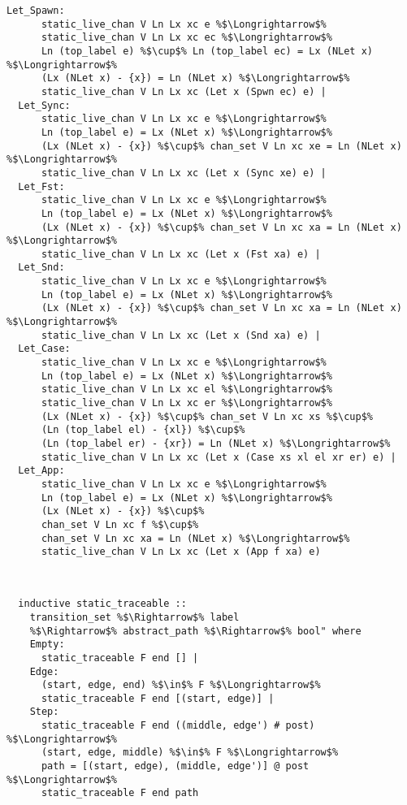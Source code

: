 \documentclass{article}
\begin{document}
\begin{lstlisting}[style=codestyle1, escapechar=\%]
  Let_Spawn:
      static_live_chan V Ln Lx xc e %$\Longrightarrow$%
      static_live_chan V Ln Lx xc ec %$\Longrightarrow$%
      Ln (top_label e) %$\cup$% Ln (top_label ec) = Lx (NLet x) %$\Longrightarrow$%
      (Lx (NLet x) - {x}) = Ln (NLet x) %$\Longrightarrow$%
      static_live_chan V Ln Lx xc (Let x (Spwn ec) e) |
  Let_Sync:
      static_live_chan V Ln Lx xc e %$\Longrightarrow$%
      Ln (top_label e) = Lx (NLet x) %$\Longrightarrow$%
      (Lx (NLet x) - {x}) %$\cup$% chan_set V Ln xc xe = Ln (NLet x) %$\Longrightarrow$%
      static_live_chan V Ln Lx xc (Let x (Sync xe) e) |
  Let_Fst:
      static_live_chan V Ln Lx xc e %$\Longrightarrow$%
      Ln (top_label e) = Lx (NLet x) %$\Longrightarrow$%
      (Lx (NLet x) - {x}) %$\cup$% chan_set V Ln xc xa = Ln (NLet x) %$\Longrightarrow$%
      static_live_chan V Ln Lx xc (Let x (Fst xa) e) |
  Let_Snd:
      static_live_chan V Ln Lx xc e %$\Longrightarrow$%
      Ln (top_label e) = Lx (NLet x) %$\Longrightarrow$%
      (Lx (NLet x) - {x}) %$\cup$% chan_set V Ln xc xa = Ln (NLet x) %$\Longrightarrow$%
      static_live_chan V Ln Lx xc (Let x (Snd xa) e) |
  Let_Case:
      static_live_chan V Ln Lx xc e %$\Longrightarrow$%
      Ln (top_label e) = Lx (NLet x) %$\Longrightarrow$%
      static_live_chan V Ln Lx xc el %$\Longrightarrow$%
      static_live_chan V Ln Lx xc er %$\Longrightarrow$%
      (Lx (NLet x) - {x}) %$\cup$% chan_set V Ln xc xs %$\cup$% 
      (Ln (top_label el) - {xl}) %$\cup$%
      (Ln (top_label er) - {xr}) = Ln (NLet x) %$\Longrightarrow$%
      static_live_chan V Ln Lx xc (Let x (Case xs xl el xr er) e) |
  Let_App:
      static_live_chan V Ln Lx xc e %$\Longrightarrow$%
      Ln (top_label e) = Lx (NLet x) %$\Longrightarrow$%
      (Lx (NLet x) - {x}) %$\cup$%
      chan_set V Ln xc f %$\cup$%
      chan_set V Ln xc xa = Ln (NLet x) %$\Longrightarrow$%
      static_live_chan V Ln Lx xc (Let x (App f xa) e)


  \end{lstlisting}


\begin{lstlisting}[style=codestyle1, escapechar=\%]

  inductive static_traceable ::
    transition_set %$\Rightarrow$% label
    %$\Rightarrow$% abstract_path %$\Rightarrow$% bool" where
    Empty:
      static_traceable F end [] |
    Edge:
      (start, edge, end) %$\in$% F %$\Longrightarrow$%
      static_traceable F end [(start, edge)] |
    Step:
      static_traceable F end ((middle, edge') # post) %$\Longrightarrow$%
      (start, edge, middle) %$\in$% F %$\Longrightarrow$%
      path = [(start, edge), (middle, edge')] @ post %$\Longrightarrow$%
      static_traceable F end path

  \end{lstlisting}
\end{document}
